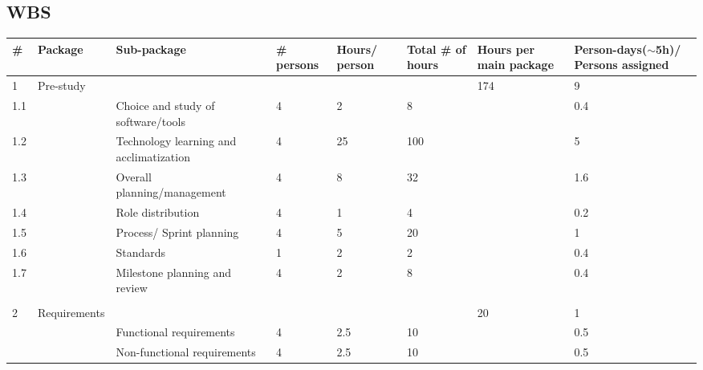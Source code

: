 \subsection{WBS}
\setlength\tabcolsep{2pt}
\begin{longtable}{|p{0.7cm}|p{3cm}|p{2cm}|p{2cm}|p{2cm}|p{2cm}|p{2cm}|p{2cm}|}
\hline
\# & Package & Sub-package & \# persons & Hours/ person & Total \# of hours & Hours per main package & Person-days($\sim$5h)/ Persons assigned\\
\hline
1 & Pre-study &  &  &  &  & 174 & 9\\ 
\hline
1.1 &  & Choice and study of software/tools & 4 & 2 & 8 &  & 0.4\\ 
\hline
1.2 &  & Technology learning and acclimatization & 4 & 25 & 100 &  & 5\\ 
\hline
1.3 &  & Overall planning/management & 4 & 8 & 32 &  & 1.6\\ 
\hline
1.4 &  & Role distribution & 4 & 1 & 4 &  & 0.2\\ 
\hline
1.5 &  & Process/ Sprint planning & 4 & 5 & 20 &  & 1\\ 
\hline
1.6 &  & Standards & 1 & 2 & 2 &  & 0.4\\ 
\hline
1.7 &  & Milestone planning and review & 4 & 2 & 8 &  & 0.4\\ 
\hline
 &  &  &  &  &  &  & \\ 
\hline
2 & Requirements &  &  &  &  & 20 & 1\\ 
\hline
 &  & Functional requirements & 4 & 2.5 & 10 &  & 0.5\\ 
\hline
 &  & Non-functional requirements & 4 & 2.5 & 10 &  & 0.5\\ 


\end{longtable}
